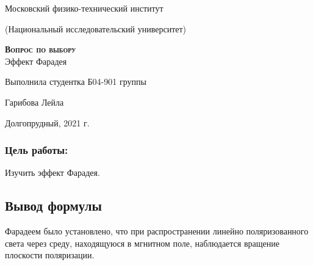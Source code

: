 \documentclass[12pt,a4paper]{article}
\begin{document}
\begin{titlepage}
  \begin{center}
    \large
    Московский физико-технический институт
    
    (Национальный исследовательский университет)
    \vspace{0.5cm}

   
    \vspace{0.25cm}
 
    \vfill
 
    \vfill

    \textsc{\bf{Вопрос по выбору}}\\[5mm]
    
    {\LARGE Эффект Фарадея}
  \bigskip
    \vfill
    
\end{center}
\vfill
\begin{flushright}

    Выполнила студентка Б04-901 группы

    Гарибова Лейла

\end{flushright}

\bigskip


\vfill

\begin{center}

  Долгопрудный, 2021 г.
\end{center}
\end{titlepage}
\newpage


\subsubsection*{Цель работы: } Изучить эффект Фарадея.

\subsection*{Вывод формулы}
Фарадеем было установлено, что при распространении линейно поляризованного света через среду, находящуюся в мгнитном поле,  наблюдается вращение плоскости поляризации. 
\end{document}
